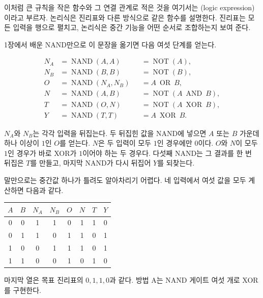 이처럼 큰 규칙을 작은 함수와 그 연결 관계로 적은 것을 여기서는 (logic expression)이라고 부르자. 논리식은 진리표와 다른 방식으로 같은 함수를 설명한다. 진리표는 모든 입력을 행으로 펼치고, 논리식은 중간 기능을 어떤 순서로 조합하는지 보여 준다.

1장에서 배운 NAND만으로 이 문장을 옮기면 다음 여섯 단계를 얻는다.

\begin{align*}
  N_A &= \operatorname{NAND}(A,A) &&= \operatorname{NOT}(A),\\
  N_B &= \operatorname{NAND}(B,B) &&= \operatorname{NOT}(B),\\
  O   &= \operatorname{NAND}(N_A,N_B) &&= A\ \operatorname{OR}\ B,\\
  N   &= \operatorname{NAND}(A,B) &&= \operatorname{NOT}(A\ \operatorname{AND}\ B),\\
  T   &= \operatorname{NAND}(O,N) &&= \operatorname{NOT}(A\ \operatorname{XOR}\ B),\\
  Y   &= \operatorname{NAND}(T,T) &&= A\ \operatorname{XOR}\ B.
\end{align*}

$N_A$와 $N_B$는 각각 입력을 뒤집는다. 두 뒤집힌 값을 NAND에 넣으면 $A$ 또는 $B$ 가운데 하나 이상이 $1$인 $O$를 얻는다. $N$은 두 입력이 모두 $1$인 경우에만 $0$이다. $O$와 $N$이 모두 $1$인 경우가 바로 XOR가 $1$이어야 하는 두 경우다. 다섯째 NAND는 그 결과를 한 번 뒤집은 $T$를 만들고, 마지막 NAND가 다시 뒤집어 $Y$를 되찾는다.

말만으로는 중간값 하나가 틀려도 알아차리기 어렵다. 네 입력에서 여섯 값을 모두 계산하면 다음과 같다.

\begin{center}
\scriptsize
\setlength{\tabcolsep}{4.2pt}
\begin{tabular}{cccccccc}
\toprule
\sffamily\bfseries $A$ & \sffamily\bfseries $B$ & \sffamily\bfseries $N_A$ & \sffamily\bfseries $N_B$ & \sffamily\bfseries $O$ & \sffamily\bfseries $N$ & \sffamily\bfseries $T$ & \sffamily\bfseries $Y$ \\
\midrule
0 & 0 & 1 & 1 & 0 & 1 & 1 & 0 \\
0 & 1 & 1 & 0 & 1 & 1 & 0 & 1 \\
1 & 0 & 0 & 1 & 1 & 1 & 0 & 1 \\
1 & 1 & 0 & 0 & 1 & 0 & 1 & 0 \\
\bottomrule
\end{tabular}
\end{center}

마지막 열은 목표 진리표의 $0,1,1,0$과 같다. 방법 A는 NAND 게이트 여섯 개로 XOR를 구현한다.

